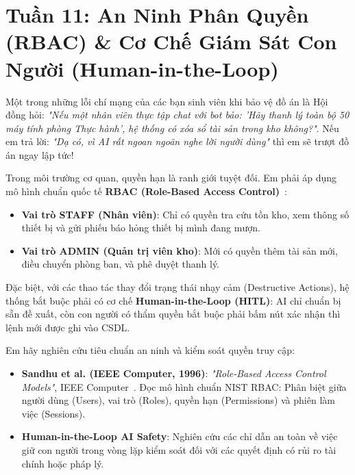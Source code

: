 ﻿\section{Tuần 11: An Ninh Phân Quyền (RBAC) \& Cơ Chế Giám Sát Con Người (Human-in-the-Loop)}
\label{sec:tuan_11}

\begin{advisorbox}
Một trong những lỗi chí mạng của các bạn sinh viên khi bảo vệ đồ án là Hội đồng hỏi: \textit{"Nếu một nhân viên thực tập chat với bot bảo: 'Hãy thanh lý toàn bộ 50 máy tính phòng Thực hành', hệ thống có xóa sổ tài sản trong kho không?"}. Nếu em trả lời: \textit{"Dạ có, vì AI rất ngoan ngoãn nghe lời người dùng"} thì em sẽ trượt đồ án ngay lập tức!

Trong môi trường cơ quan, quyền hạn là ranh giới tuyệt đối. Em phải áp dụng mô hình chuẩn quốc tế \textbf{RBAC (Role-Based Access Control)}~\cite{sandhu1996role}:
\begin{itemize}[leftmargin=1.5em]
    \item \textbf{Vai trò STAFF (Nhân viên)}: Chỉ có quyền tra cứu tồn kho, xem thông số thiết bị và gửi phiếu báo hỏng thiết bị mình đang mượn.
    \item \textbf{Vai trò ADMIN (Quản trị viên kho)}: Mới có quyền thêm tài sản mới, điều chuyển phòng ban, và phê duyệt thanh lý.
\end{itemize}
Đặc biệt, với các thao tác thay đổi trạng thái nhạy cảm (Destructive Actions), hệ thống bắt buộc phải có cơ chế \textbf{Human-in-the-Loop (HITL)}: AI chỉ chuẩn bị sẵn đề xuất, còn con người có thẩm quyền bắt buộc phải bấm nút xác nhận thì lệnh mới được ghi vào CSDL.
\end{advisorbox}

\begin{literaturebox}
Em hãy nghiên cứu tiêu chuẩn an ninh và kiểm soát quyền truy cập:
\begin{itemize}[leftmargin=1.5em]
    \item \textbf{Sandhu et al. (IEEE Computer, 1996)}: \textit{"Role-Based Access Control Models"}, IEEE Computer~\cite{sandhu1996role}. Đọc mô hình chuẩn NIST RBAC: Phân biệt giữa người dùng (Users), vai trò (Roles), quyền hạn (Permissions) và phiên làm việc (Sessions).
    \item \textbf{Human-in-the-Loop AI Safety}: Nghiên cứu các chỉ dẫn an toàn về việc giữ con người trong vòng lặp kiểm soát đối với các quyết định có rủi ro tài chính hoặc pháp lý.
\end{itemize}
\end{literaturebox}

